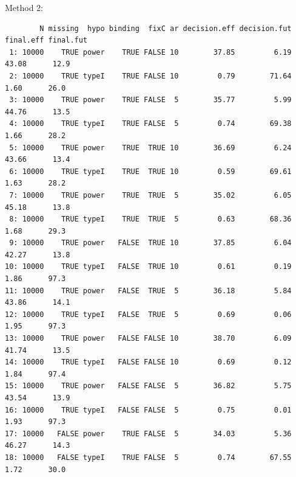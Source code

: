 \documentclass[12pt]{article}
\begin{document}
Method 2:
\begin{verbatim}
        N missing  hypo binding  fixC ar decision.eff decision.fut final.eff final.fut
 1: 10000    TRUE power    TRUE FALSE 10        37.85         6.19     43.08      12.9
 2: 10000    TRUE typeI    TRUE FALSE 10         0.79        71.64      1.60      26.0
 3: 10000    TRUE power    TRUE FALSE  5        35.77         5.99     44.76      13.5
 4: 10000    TRUE typeI    TRUE FALSE  5         0.74        69.38      1.66      28.2
 5: 10000    TRUE power    TRUE  TRUE 10        36.69         6.24     43.66      13.4
 6: 10000    TRUE typeI    TRUE  TRUE 10         0.59        69.61      1.63      28.2
 7: 10000    TRUE power    TRUE  TRUE  5        35.02         6.05     45.18      13.8
 8: 10000    TRUE typeI    TRUE  TRUE  5         0.63        68.36      1.68      29.3
 9: 10000    TRUE power   FALSE  TRUE 10        37.85         6.04     42.27      13.8
10: 10000    TRUE typeI   FALSE  TRUE 10         0.61         0.19      1.86      97.3
11: 10000    TRUE power   FALSE  TRUE  5        36.18         5.84     43.86      14.1
12: 10000    TRUE typeI   FALSE  TRUE  5         0.69         0.06      1.95      97.3
13: 10000    TRUE power   FALSE FALSE 10        38.70         6.09     41.74      13.5
14: 10000    TRUE typeI   FALSE FALSE 10         0.69         0.12      1.84      97.4
15: 10000    TRUE power   FALSE FALSE  5        36.82         5.75     43.54      13.9
16: 10000    TRUE typeI   FALSE FALSE  5         0.75         0.01      1.93      97.3
17: 10000   FALSE power    TRUE FALSE  5        34.03         5.36     46.27      14.3
18: 10000   FALSE typeI    TRUE FALSE  5         0.74        67.55      1.72      30.0
\end{verbatim}

\clearpage
\end{document}
